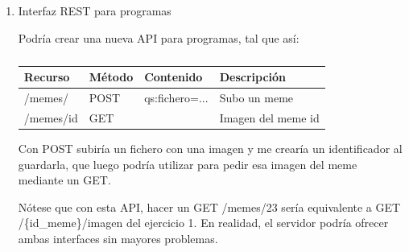 \begin{enumerate}
\begin{verbatim}
B + Cookie: id="a1b2..."
Respuesta: 200 OK + banner.png

C + Cookie: id="5678..."
Repuesta: 200 OK + pixel.png

D para la imagen del meme 28 + Cookie: id="a1b2..."
Respuesta: 200 OK + imagen del meme 43

\end{verbatim}

\item Interfaz REST para programas

Podría crear una nueva API para programas, tal que así:

\begin{table}[h!]
\begin{center}
\begin{tabular}{|l|l|l|l|} 
 \hline
Recurso                & Método & Contenido                                            & Descripción                           \\ \hline \hline
/memes/                & POST   & qs:fichero=...                                       & Subo un meme                          \\ \hline
/memes/{id}            & GET    &                                                      & Imagen del meme id                \\ \hline
\end{tabular}
\caption{}
\label{tab:my-table2}
\end{center}
\end{table}

Con POST subiría un fichero con una imagen y me crearía un identificador al guardarla, que luego podría utilizar para pedir esa imagen del meme mediante un GET.

Nótese que con esta API, hacer un GET /memes/23 sería equivalente a GET /\{id\_meme\}/imagen del ejercicio 1. En realidad, el servidor podría ofrecer ambas interfaces sin mayores problemas.

\end{enumerate}
